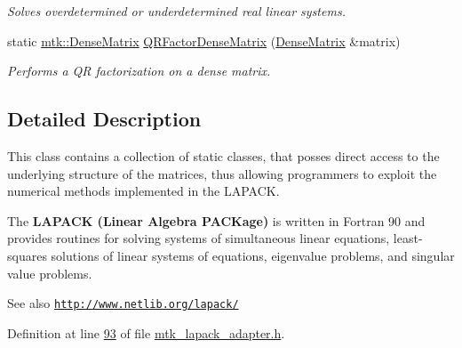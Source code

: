\begin{DoxyCompactItemize}
\begin{DoxyCompactList}\small\item\em Solves overdetermined or underdetermined real linear systems. \end{DoxyCompactList}\item 
static \hyperlink{classmtk_1_1DenseMatrix}{mtk\+::\+Dense\+Matrix} \hyperlink{classmtk_1_1LAPACKAdapter_ae5c6e78c9c819c9ac7a6f31bfd011d7a}{Q\+R\+Factor\+Dense\+Matrix} (\hyperlink{classmtk_1_1DenseMatrix}{Dense\+Matrix} \&matrix)
\begin{DoxyCompactList}\small\item\em Performs a Q\+R factorization on a dense matrix. \end{DoxyCompactList}\end{DoxyCompactItemize}


\subsection{Detailed Description}
This class contains a collection of static classes, that posses direct access to the underlying structure of the matrices, thus allowing programmers to exploit the numerical methods implemented in the L\+A\+P\+A\+C\+K.

The {\bfseries L\+A\+P\+A\+C\+K (Linear Algebra P\+A\+C\+Kage)} is written in Fortran 90 and provides routines for solving systems of simultaneous linear equations, least-\/squares solutions of linear systems of equations, eigenvalue problems, and singular value problems.

\begin{DoxySeeAlso}{See also}
\href{http://www.netlib.org/lapack/}{\tt http\+://www.\+netlib.\+org/lapack/} 
\end{DoxySeeAlso}


Definition at line \hyperlink{mtk__lapack__adapter_8h_source_l00093}{93} of file \hyperlink{mtk__lapack__adapter_8h_source}{mtk\+\_\+lapack\+\_\+adapter.\+h}.



